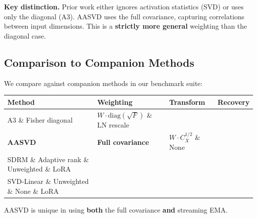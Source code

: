 \textbf{Key distinction.} Prior work either ignores activation statistics (SVD) 
or uses only the diagonal (A3). AASVD uses the full covariance, capturing 
correlations between input dimensions. This is a \textbf{strictly more general} 
weighting than the diagonal case.

\subsection{Comparison to Companion Methods}

We compare against companion methods in our benchmark suite:

\begin{table}[H]
\centering
\small
\begin{tabular}{llll}
\toprule
\textbf{Method} & \textbf{Weighting} & \textbf{Transform} & \textbf{Recovery} \\
\midrule
A3 \& Fisher diagonal & $W \cdot \mathrm{diag}(\sqrt{F})$ \& LN rescale \\
\textbf{AASVD} & \textbf{Full covariance} & $W \cdot C_X^{1/2}$ \& None \\
SDRM \& Adaptive rank \& Unweighted \& LoRA \\
SVD-Linear \& Unweighted \& None \& LoRA \\
\bottomrule
\end{tabular}
\end{table}

AASVD is unique in using \textbf{both} the full covariance \textbf{and} streaming EMA.